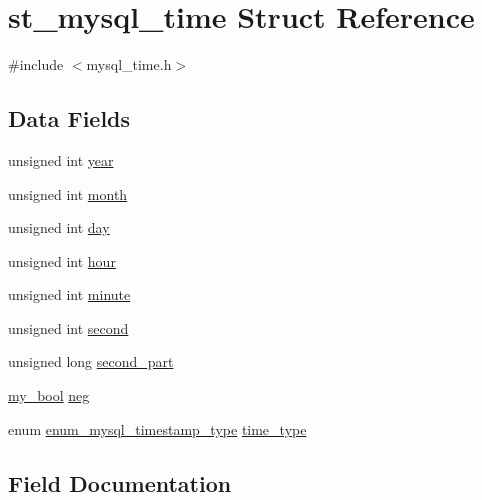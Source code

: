 \hypertarget{structst__mysql__time}{}\section{st\+\_\+mysql\+\_\+time Struct Reference}
\label{structst__mysql__time}


{\ttfamily \#include $<$mysql\+\_\+time.\+h$>$}

\subsection*{Data Fields}
\begin{DoxyCompactItemize}
\item 
unsigned int \hyperlink{structst__mysql__time_a2fb9953d417685aaf398eec5d437374a}{year}
\item 
unsigned int \hyperlink{structst__mysql__time_a45f08f891e62f744268670f8ca6a35e1}{month}
\item 
unsigned int \hyperlink{structst__mysql__time_a90fc6fbcdaccf2fed84fc1ce94832df5}{day}
\item 
unsigned int \hyperlink{structst__mysql__time_aa5b5cd234b2fbd7b59a9f6a5fb7973f4}{hour}
\item 
unsigned int \hyperlink{structst__mysql__time_a41f0b1ccc6e087271c9569956ef57634}{minute}
\item 
unsigned int \hyperlink{structst__mysql__time_a01759e2debb2c19a1116f2e2428c5a28}{second}
\item 
unsigned long \hyperlink{structst__mysql__time_a856f752bf9266990880feae2673f8eba}{second\+\_\+part}
\item 
\hyperlink{mysql_8h_a74cd599039dcf29c6e6d342cf4efd0a8}{my\+\_\+bool} \hyperlink{structst__mysql__time_afeec1da689e3e7102864a517eafd8df8}{neg}
\item 
enum \hyperlink{mysql__time_8h_aa633db8da896a5a0cc00ffcfb7477e73}{enum\+\_\+mysql\+\_\+timestamp\+\_\+type} \hyperlink{structst__mysql__time_a129453ae2fee84375c0b0ab17962325b}{time\+\_\+type}
\end{DoxyCompactItemize}


\subsection{Field Documentation}
\hypertarget{structst__mysql__time_a90fc6fbcdaccf2fed84fc1ce94832df5}{}

